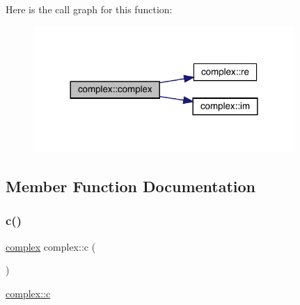 Here is the call graph for this function\+:
\nopagebreak
\begin{figure}[H]
\begin{center}
\leavevmode
\includegraphics[width=281pt]{classcomplex_a57fa59491a94c3aeeb5b005fed5d0ed4_cgraph}
\end{center}
\end{figure}


\subsection{Member Function Documentation}
\mbox{\label{classcomplex_a4741546b5617d11e87ee7831067c84c5}} 
\subsubsection{\texorpdfstring{c()}{c()}}
{\footnotesize\ttfamily \mbox{\hyperlink{classcomplex}{complex}} complex\+::c (\begin{DoxyParamCaption}{ }\end{DoxyParamCaption})}



\mbox{\hyperlink{classcomplex_a4741546b5617d11e87ee7831067c84c5}{complex\+::c}} 

